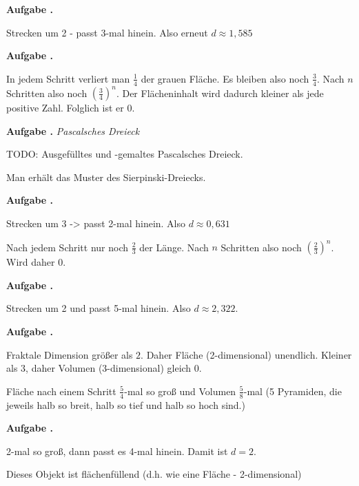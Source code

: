 \documentclass[a4paper,ngerman,12pt]{scrartcl}
\theoremstyle{definition}
\theoremstyle{plain}
\theoremstyle{remark}
\newlength{\aufgabenskip}
\newcounter{aufgabennummer}
\newenvironment{aufgabe}[1]{
  \addtocounter{aufgabennummer}{1}
  \textbf{Aufgabe \theaufgabennummer.} \emph{#1} \par
}{\vspace{\aufgabenskip}}
\begin{document}
\begin{aufgabe}{}\label{aufgabe:Sierpinski-Flaeche}
	Strecken um 2 - passt 3-mal hinein. Also erneut $d \approx 1,585$
\end{aufgabe}

\begin{aufgabe}{}
	In jedem Schritt verliert man $\frac{1}{4}$ der grauen Fläche. Es bleiben also noch $\frac{3}{4}$. Nach $n$ Schritten also noch $\left(\frac{3}{4}\right)^n$. Der Flächeninhalt wird dadurch kleiner als jede positive Zahl. Folglich ist er $0$.
\end{aufgabe}

\begin{aufgabe}{Pascalsches Dreieck}
	TODO: Ausgefülltes und -gemaltes Pascalsches Dreieck.
	
	Man erhält das Muster des Sierpinski-Dreiecks.
\end{aufgabe}

\begin{aufgabe}{}
	Strecken um 3 -> passt 2-mal hinein. Also $d \approx 0,631$
	
	Nach jedem Schritt nur noch $\frac{2}{3}$ der Länge. Nach $n$ Schritten also noch $\left(\frac{2}{3}\right)^n$. Wird daher 0.
\end{aufgabe}

\begin{aufgabe}{}
	Strecken um 2 und passt 5-mal hinein. Also $d \approx 2,322$.
\end{aufgabe}
	
\begin{aufgabe}{}
	Fraktale Dimension größer als $2$. Daher Fläche (2-dimensional) unendlich. Kleiner als $3$, daher Volumen (3-dimensional) gleich 0.
	
	Fläche nach einem Schritt $\frac{5}{4}$-mal so groß und Volumen $\frac{5}{8}$-mal (5 Pyramiden, die jeweils halb so breit, halb so tief und halb so hoch sind.)
\end{aufgabe}

\begin{aufgabe}{}
	2-mal so groß, dann passt es 4-mal hinein. Damit ist $d = 2$. 
	
	Dieses Objekt ist flächenfüllend (d.h. wie eine Fläche - 2-dimensional)
\end{aufgabe}
\end{document}
